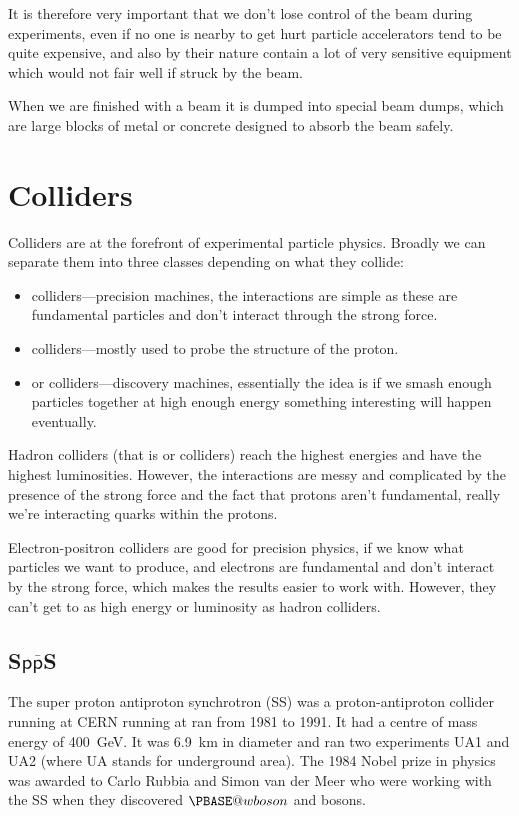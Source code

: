 \documentclass[fleqn]{NotesClass}
\makeatletter
\newcommand{\Pwboson}{\ensuremath{\PBASE@wboson}}
\newcommand{\PW}{\Pwboson}
\makeatother
\begin{document}
    It is therefore very important that we don't lose control of the beam during experiments, even if no one is nearby to get hurt particle accelerators tend to be quite expensive, and also by their nature contain a lot of very sensitive equipment which would not fair well if struck by the beam.
    
    When we are finished with a beam it is dumped into special beam dumps, which are large blocks of metal or concrete designed to absorb the beam safely.
    
    \section{Colliders}
    Colliders are at the forefront of experimental particle physics.
    Broadly we can separate them into three classes depending on what they collide:
    \begin{itemize}
        \item \Pe\APe{} colliders---precision machines, the interactions are simple as these are fundamental particles and don't interact through the strong force.
        \item \Pe\Pp{} colliders---mostly used to probe the structure of the proton.
        \item \Pp\Pp{} or \Pp\APp{} colliders---discovery machines, essentially the idea is if we smash enough particles together at high enough energy something interesting will happen eventually.
    \end{itemize}
    
    Hadron colliders (that is \Pp\Pp{} or \Pp\APp{} colliders) reach the highest energies and have the highest luminosities.
    However, the interactions are messy and complicated by the presence of the strong force and the fact that protons aren't fundamental, really we're interacting quarks within the protons.
    
    Electron-positron colliders are good for precision physics, if we know what particles we want to produce, and electrons are fundamental and don't interact by the strong force, which makes the results easier to work with.
    However, they can't get to as high energy or luminosity as hadron colliders.
    
    \subsection{\texorpdfstring{S\(\mathsf{p\overline{p}}\)S}{SppS}}
    The super proton antiproton synchrotron (S\Pp\APp S) was a proton-antiproton collider running at CERN running at ran from 1981 to 1991.
    It had a centre of mass energy of \qty{400}{\giga\electronvolt}.
    It was \qty{6.9}{\kilo\metre} in diameter and ran two experiments UA1 and UA2 (where UA stands for underground area).
    The 1984 Nobel prize in physics was awarded to Carlo Rubbia and Simon van der Meer who were working with the S\Pp\APp S when they discovered \PW{} and \PZ{} bosons.
    
\end{document}

